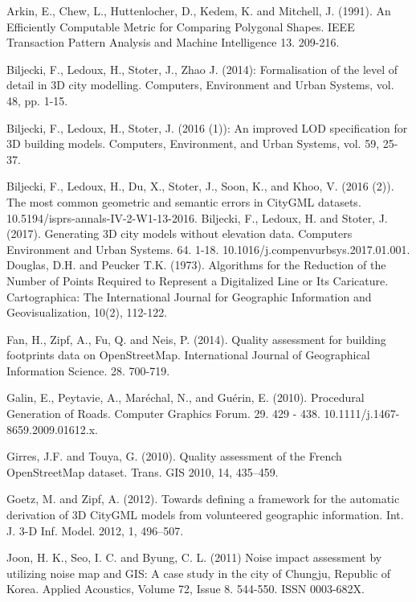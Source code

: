 \documentclass{kththesis}
\begin{document}
\begin{thebibliography}{9}

Arkin, E., Chew, L., Huttenlocher, D., Kedem, K. and Mitchell, J. (1991). An Efficiently Computable Metric for Comparing Polygonal Shapes. IEEE Transaction Pattern Analysis and Machine Intelligence 13. 209-216.

Biljecki, F., Ledoux, H., Stoter, J., Zhao J. (2014): Formalisation of the level of detail in 3D city modelling. Computers, Environment and Urban Systems, vol. 48, pp. 1-15.

Biljecki, F., Ledoux, H., Stoter, J. (2016 (1)): An improved LOD specification for 3D building models. Computers, Environment, and Urban Systems, vol. 59, 25-37.

    Biljecki, F., Ledoux, H., Du, X., Stoter, J., Soon, K., and Khoo, V. (2016 (2)). The most common geometric and semantic errors in CityGML datasets. 10.5194/isprs-annals-IV-2-W1-13-2016. 
Biljecki, F., Ledoux, H. and Stoter, J. (2017). Generating 3D city models without elevation data. Computers Environment and Urban Systems. 64. 1-18. 10.1016/j.compenvurbsys.2017.01.001. 
Douglas, D.H. and Peucker T.K. (1973). Algorithms for the Reduction of the Number of Points Required to Represent a Digitalized Line or Its Caricature. Cartographica: The International Journal for Geographic Information and Geovisualization, 10(2), 112-122.

Fan, H., Zipf, A., Fu, Q. and Neis, P. (2014). Quality assessment for building footprints data on OpenStreetMap. International Journal of Geographical Information Science. 28. 700-719.

Galin, E., Peytavie, A., Maréchal, N., and Guérin, E. (2010). Procedural Generation of Roads. Computer Graphics Forum. 29. 429 - 438. 10.1111/j.1467-8659.2009.01612.x. 

Girres, J.F. and Touya, G. (2010). Quality assessment of the French OpenStreetMap dataset. Trans. GIS 2010, 14, 435–459.

Goetz, M. and Zipf, A. (2012). Towards defining a framework for the automatic derivation of 3D CityGML models from volunteered geographic information. Int. J. 3-D Inf. Model. 2012, 1, 496–507.

Joon, H. K., Seo, I. C. and Byung, C. L. (2011) Noise impact assessment by utilizing noise map and GIS: A case study in the city of Chungju, Republic of Korea. Applied Acoustics, Volume 72, Issue 8. 544-550. ISSN 0003-682X.


\end{thebibliography}
\end{document}
